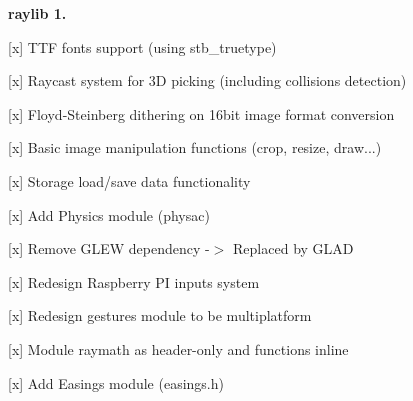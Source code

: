 {\bfseries{raylib 1.}}
\begin{DoxyItemize}
\item \mbox{[}x\mbox{]} TTF fonts support (using stb\+\_\+truetype)
\item \mbox{[}x\mbox{]} Raycast system for 3D picking (including collisions detection)
\item \mbox{[}x\mbox{]} Floyd-\/\+Steinberg dithering on 16bit image format conversion
\item \mbox{[}x\mbox{]} Basic image manipulation functions (crop, resize, draw...)
\item \mbox{[}x\mbox{]} Storage load/save data functionality
\item \mbox{[}x\mbox{]} Add Physics module (physac)
\item \mbox{[}x\mbox{]} Remove GLEW dependency -\/\texorpdfstring{$>$}{>} Replaced by GLAD
\item \mbox{[}x\mbox{]} Redesign Raspberry PI inputs system
\item \mbox{[}x\mbox{]} Redesign gestures module to be multiplatform
\item \mbox{[}x\mbox{]} Module raymath as header-\/only and functions inline
\item \mbox{[}x\mbox{]} Add Easings module (easings.\+h) 
\end{DoxyItemize}